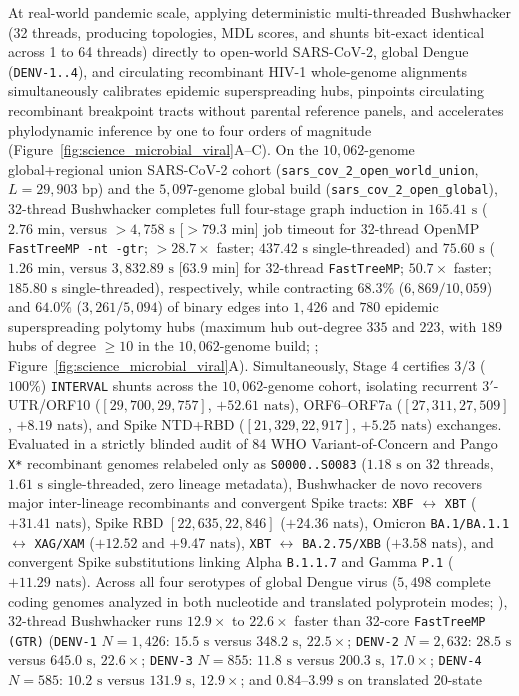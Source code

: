 \documentclass[11pt,a4paper]{article}
\begin{document}
At real-world pandemic scale, applying deterministic multi-threaded Bushwhacker (32 threads, producing topologies, MDL scores, and shunts bit-exact identical across 1 to 64 threads) directly to open-world SARS-CoV-2, global Dengue (\texttt{DENV-1..4}), and circulating recombinant HIV-1 whole-genome alignments simultaneously calibrates epidemic superspreading hubs, pinpoints circulating recombinant breakpoint tracts without parental reference panels, and accelerates phylodynamic inference by one to four orders of magnitude (Figure~\ref{fig:science_microbial_viral}A--C). On the $10,062$-genome global+regional union SARS-CoV-2 cohort (\texttt{sars\_cov\_2\_open\_world\_union}, $L = 29,903\text{ bp}$) and the $5,097$-genome global build (\texttt{sars\_cov\_2\_open\_global}), 32-thread Bushwhacker completes full four-stage graph induction in $165.41\text{ s}$ ($2.76\text{ min}$, versus $>4,758\text{ s}$ [$>79.3\text{ min}$] job timeout for 32-thread OpenMP \texttt{FastTreeMP -nt -gtr}; $>28.7\times$ faster; $437.42\text{ s}$ single-threaded) and $75.60\text{ s}$ ($1.26\text{ min}$, versus $3,832.89\text{ s}$ [$63.9\text{ min}$] for 32-thread \texttt{FastTreeMP}; $50.7\times$ faster; $185.80\text{ s}$ single-threaded), respectively, while contracting $68.3\%$ ($6,869 / 10,059$) and $64.0\%$ ($3,261 / 5,094$) of binary edges into $1,426$ and $780$ epidemic superspreading polytomy hubs (maximum hub out-degree $335$ and $223$, with $189$ hubs of degree $\ge 10$ in the $10,062$-genome build; \citealt{turakhia2022pandemic}; Figure~\ref{fig:science_microbial_viral}A). Simultaneously, Stage 4 certifies $3 / 3$ ($100\%$) \texttt{INTERVAL} shunts across the $10,062$-genome cohort, isolating recurrent 3$'$-UTR/ORF10 ($[29{,}700, 29{,}757]$, $+52.61\text{ nats}$), ORF6--ORF7a ($[27{,}311, 27{,}509]$, $+8.19\text{ nats}$), and Spike NTD+RBD ($[21{,}329, 22{,}917]$, $+5.25\text{ nats}$) exchanges. Evaluated in a strictly blinded audit of $84$ WHO Variant-of-Concern and Pango \texttt{X*} recombinant genomes relabeled only as \texttt{S0000..S0083} ($1.18\text{ s}$ on 32 threads, $1.61\text{ s}$ single-threaded, zero lineage metadata), Bushwhacker de novo recovers major inter-lineage recombinants and convergent Spike tracts: \texttt{XBF} $\leftrightarrow$ \texttt{XBT} ($+31.41\text{ nats}$), Spike RBD $[22{,}635, 22{,}846]$ ($+24.36\text{ nats}$), Omicron \texttt{BA.1/BA.1.1} $\leftrightarrow$ \texttt{XAG/XAM} ($+12.52$ and $+9.47\text{ nats}$), \texttt{XBT} $\leftrightarrow$ \texttt{BA.2.75/XBB} ($+3.58\text{ nats}$), and convergent Spike substitutions linking Alpha \texttt{B.1.1.7} and Gamma \texttt{P.1} ($+11.29\text{ nats}$). Across all four serotypes of global Dengue virus ($5,498$ complete coding genomes analyzed in both nucleotide and translated polyprotein modes; \citealt{worobey1999widespread}), 32-thread Bushwhacker runs $12.9\times$ to $22.6\times$ faster than 32-core \texttt{FastTreeMP (GTR)} (\texttt{DENV-1} $N = 1,426$: $15.5\text{ s}$ versus $348.2\text{ s}$, $22.5\times$; \texttt{DENV-2} $N = 2,632$: $28.5\text{ s}$ versus $645.0\text{ s}$, $22.6\times$; \texttt{DENV-3} $N = 855$: $11.8\text{ s}$ versus $200.3\text{ s}$, $17.0\times$; \texttt{DENV-4} $N = 585$: $10.2\text{ s}$ versus $131.9\text{ s}$, $12.9\times$; and $0.84\text{--}3.99\text{ s}$ on translated 20-state 
\end{document}
